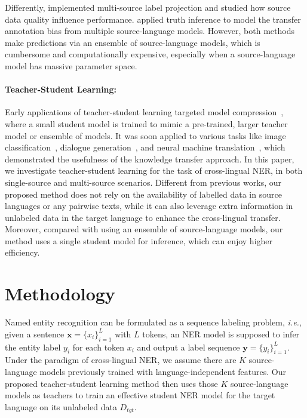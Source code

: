 \documentclass[11pt,a4paper]{article}
\newcommand\ie{\textit{i.e.}}
\begin{document}
	Differently, \citet{enghoff2018low} implemented multi-source label projection and studied how source data quality influence performance. 
	\citet{rahimi2019massively} applied truth inference to model the transfer annotation bias from multiple source-language models. However, both methods make predictions via an ensemble of source-language models, which is cumbersome and computationally expensive, especially when a source-language model has massive parameter space.
	
	\paragraph{Teacher-Student Learning: }
	Early applications of teacher-student learning targeted model compression~\cite{bucilu2006model}, where a small student model is trained to mimic a pre-trained, larger teacher model or ensemble of models. It was soon applied to various tasks like image classification~\cite{hinton2015distilling,you2017learning}, dialogue generation~\cite{peng2019teacher}, and neural machine translation~\cite{tan2019multilingual}, which demonstrated the usefulness of the knowledge transfer approach.
\newline
	\newline
	In this paper, we investigate teacher-student learning for the task of cross-lingual NER, in both single-source and multi-source scenarios. Different from previous works, our proposed method does not rely on the availability of labelled data in source languages or any pairwise texts, while it can also leverage extra information in unlabeled data in the target language to enhance the cross-lingual transfer. Moreover, compared with using an ensemble of source-language models, our method uses a single student model for inference, which can enjoy higher efficiency.
	


	\section{Methodology}
	Named entity recognition can be formulated as a sequence labeling problem, \ie, given a sentence $\bm{x} = \{ x_i \}_{i=1}^L$ with $L$ tokens, an NER model is supposed to infer the entity label $y_i$ for each token $x_i$ and output a label sequence $\bm{y} = \{ y_i \}_{i=1}^L$. 
	Under the paradigm of cross-lingual NER, we assume there are $K$ source-language models previously trained with language-independent features. Our proposed teacher-student learning method then uses those $K$ source-language models as teachers to train an effective student NER model for the target language on its unlabeled data $D_{tgt}$. 
\end{document}
